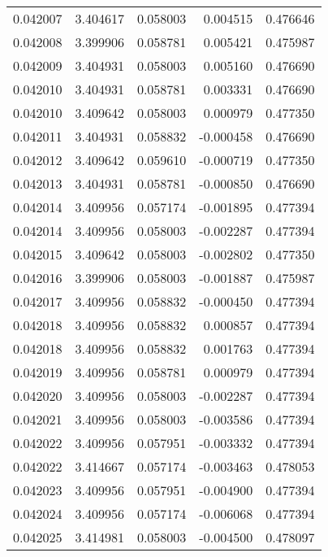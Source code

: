 \begin{tabular}{lrrrr}
0.042007    &  3.404617 &  0.058003 &  0.004515 &             0.476646 \\
0.042008    &  3.399906 &  0.058781 &  0.005421 &             0.475987 \\
0.042009    &  3.404931 &  0.058003 &  0.005160 &             0.476690 \\
0.042010    &  3.404931 &  0.058781 &  0.003331 &             0.476690 \\
0.042010    &  3.409642 &  0.058003 &  0.000979 &             0.477350 \\
0.042011    &  3.404931 &  0.058832 & -0.000458 &             0.476690 \\
0.042012    &  3.409642 &  0.059610 & -0.000719 &             0.477350 \\
0.042013    &  3.404931 &  0.058781 & -0.000850 &             0.476690 \\
0.042014    &  3.409956 &  0.057174 & -0.001895 &             0.477394 \\
0.042014    &  3.409956 &  0.058003 & -0.002287 &             0.477394 \\
0.042015    &  3.409642 &  0.058003 & -0.002802 &             0.477350 \\
0.042016    &  3.399906 &  0.058003 & -0.001887 &             0.475987 \\
0.042017    &  3.409956 &  0.058832 & -0.000450 &             0.477394 \\
0.042018    &  3.409956 &  0.058832 &  0.000857 &             0.477394 \\
0.042018    &  3.409956 &  0.058832 &  0.001763 &             0.477394 \\
0.042019    &  3.409956 &  0.058781 &  0.000979 &             0.477394 \\
0.042020    &  3.409956 &  0.058003 & -0.002287 &             0.477394 \\
0.042021    &  3.409956 &  0.058003 & -0.003586 &             0.477394 \\
0.042022    &  3.409956 &  0.057951 & -0.003332 &             0.477394 \\
0.042022    &  3.414667 &  0.057174 & -0.003463 &             0.478053 \\
0.042023    &  3.409956 &  0.057951 & -0.004900 &             0.477394 \\
0.042024    &  3.409956 &  0.057174 & -0.006068 &             0.477394 \\
0.042025    &  3.414981 &  0.058003 & -0.004500 &             0.478097 \\

\end{tabular}
